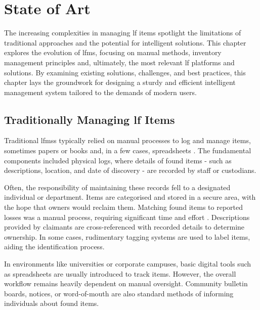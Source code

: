 \chapter{State of Art} \label{chapter:state_of_art}

The increasing complexities in managing \ac{lf} items spotlight the limitations of traditional approaches and the potential for intelligent solutions. This chapter explores the evolution of \ac{lfms}, focusing on manual methods, inventory management principles and, ultimately, the most relevant \ac{lf} platforms and solutions. By examining existing solutions, challenges, and best practices, this chapter lays the groundwork for designing a sturdy and efficient intelligent management system tailored to the demands of modern users.


\section{Traditionally Managing \acl{lf} Items} \label{sec:manually-managing-lf-items}


Traditional \acp{lfms} typically relied on manual processes to log and manage items, sometimes papers or books and, in a few cases, spreadsheets \cite{Anas2023}. The fundamental components included physical logs, where details of found items - such as descriptions, location, and date of discovery - are recorded by staff or custodians.

Often, the responsibility of maintaining these records fell to a designated individual or department. Items are categorised and stored in a secure area, with the hope that owners would reclaim them. Matching found items to reported losses was a manual process, requiring significant time and effort \cite{Anas2023}. Descriptions provided by claimants are cross-referenced with recorded details to determine ownership. In some cases, rudimentary tagging systems are used to label items, aiding the identification process.

In environments like universities or corporate campuses, basic digital tools such as spreadsheets are usually introduced to track items. However, the overall workflow remains heavily dependent on manual oversight. Community bulletin boards, notices, or word-of-mouth are also standard methods of informing individuals about found items.

